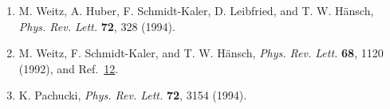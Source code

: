 \begin{enumerate}
\item \hypertarget{ref:14.12}{}M. Weitz, A. Huber, F. Schmidt-Kaler,
D. Leibfried, and T. W. H\"ansch, \emph{Phys. Rev. Lett.} \textbf{72}, 328
(1994).

\item \hypertarget{ref:14.13}{}M. Weitz, F. Schmidt-Kaler, and T. W. H\"ansch,
\emph{Phys. Rev. Lett.} \textbf{68}, 1120 (1992), and
Ref.~\hyperlink{ref:14.12}{12}.

\item \hypertarget{ref:14.14}{}K. Pachucki, \emph{Phys. Rev. Lett.}
\textbf{72}, 3154 (1994).
\end{enumerate}
